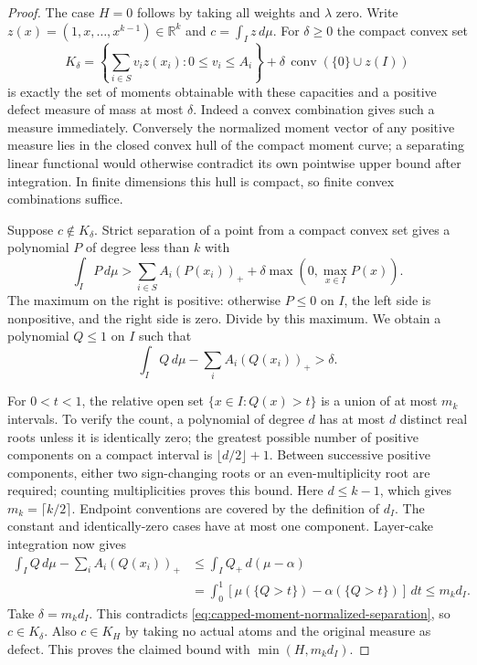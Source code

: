 \documentclass[11pt]{article}
\theoremstyle{definition}
\begin{document}
\begin{proof}
The case $H=0$ follows by taking all weights and $\lambda$ zero.
Write $z(x)=(1,x,\ldots,x^{k-1})\in\mathbb R^k$ and
$c=\int_I z\,d\mu$.
For $\delta\ge0$ the compact convex set
\[
 K_\delta=
 \left\{\sum_{i\in S}v_i z(x_i):0\le v_i\le A_i\right\}
       +\delta\,\operatorname{conv}(\{0\}\cup z(I))
\]
is exactly the set of moments obtainable with these capacities
and a positive defect measure of mass at most $\delta$.
Indeed a convex combination gives such a measure immediately.
Conversely the normalized moment vector of any positive measure
lies in the closed convex hull of the compact moment curve;
a separating linear functional would otherwise contradict its
own pointwise upper bound after integration. In finite dimensions
this hull is compact, so finite convex combinations suffice.

Suppose $c\notin K_\delta$. Strict separation of a point from a
compact convex set gives a polynomial $P$ of degree less than $k$
with
\begin{equation}
 \int_I P\,d\mu>
       \sum_{i\in S}A_i(P(x_i))_+
                  +\delta\max(0,\max_{x\in I}P(x)).
 \label{eq:capped-moment-separation}
\end{equation}
The maximum on the right is positive: otherwise $P\le0$ on $I$,
the left side is nonpositive, and the right side is zero.
Divide by this maximum. We obtain a polynomial $Q\le1$ on $I$
such that
\begin{equation}
 \int_I Q\,d\mu-\sum_i A_i(Q(x_i))_+>\delta.
 \label{eq:capped-moment-normalized-separation}
\end{equation}

For $0<t<1$, the relative open set $\{x\in I:Q(x)>t\}$ is a union
of at most $m_k$ intervals. To verify the count, a polynomial of
degree $d$ has at most $d$ distinct real roots unless it is
identically zero; the greatest possible number of positive
components on a compact interval is $\lfloor d/2\rfloor+1$.
Between successive positive components, either two sign-changing
roots or an even-multiplicity root are required; counting
multiplicities proves this bound. Here $d\le k-1$, which gives
$m_k=\lceil k/2\rceil$.
Endpoint conventions are covered by the definition of $d_I$.
The constant and identically-zero cases have at most one
component. Layer-cake integration now gives
\begin{align*}
 \int_I Q\,d\mu-\sum_i A_i(Q(x_i))_+
 &\le \int_I Q_+\,d(\mu-\alpha)\\
 &=\int_0^1
       [\mu(\{Q>t\})-\alpha(\{Q>t\})]\,dt
 \le m_k d_I .
\end{align*}
Take $\delta=m_kd_I$. This contradicts
\eqref{eq:capped-moment-normalized-separation}, so $c\in K_\delta$.
Also $c\in K_H$ by taking no actual atoms and the original
measure as defect. This proves the claimed bound with
$\min(H,m_kd_I)$.


\end{proof}
\end{document}
